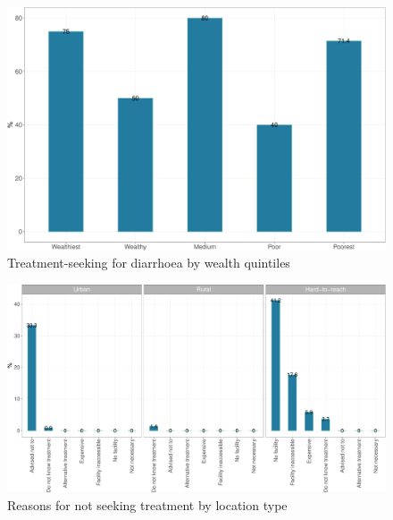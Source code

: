 \documentclass[12pt,a4paper]{article}
\begin{document}
\begin{figure}[H]

{\centering \includegraphics{kayahReport_files/figure-latex/diarrhoea2plot-1} 

}

\caption{Treatment-seeking for diarrhoea by wealth quintiles}\label{fig:diarrhoea2plot}
\end{figure}

\begin{figure}[H]

{\centering \includegraphics{kayahReport_files/figure-latex/diarrhoea4plot-1} 

}

\caption{Reasons for not seeking treatment by location type}\label{fig:diarrhoea4plot}
\end{figure}
\end{document}
